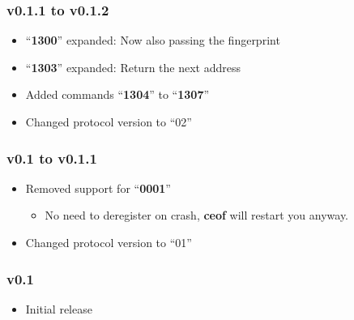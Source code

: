\documentclass[12pt,a4paper]{book}
\begin{document}
\subsubsection{v0.1.1 to v0.1.2}
\begin{itemize}
\item "`\textbf{1300}"' expanded: Now also passing the fingerprint
\item "`\textbf{1303}"' expanded: Return the next address
\item Added commands "`\textbf{1304}"' to "`\textbf{1307}"'
\item Changed protocol version to "`02"'
\end{itemize}
\subsubsection{v0.1 to v0.1.1}
\begin{itemize}
\item Removed support for "`\textbf{0001}"'
\begin{itemize}
\item No need to deregister on crash, \textbf{ceof} will restart you anyway.
\end{itemize}
\item Changed protocol version to "`01"'
\end{itemize}
\subsubsection{v0.1}
\begin{itemize}
\item Initial release
\end{itemize}
\end{document}
